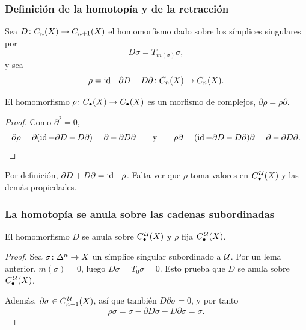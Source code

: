 \begin{frame}[allowframebreaks]
  \frametitle{Definición de la homotopía y de la retracción}

  \begin{definition}
    Sea $D\colon C_n(X)\to C_{n+1}(X)$ el homomorfismo dado sobre los
    símplices singulares por
    \[
      D\sigma=T_{m(\sigma)}\sigma,
    \]
    y sea \[\rho=\operatorname{id}-\partial D-D\partial\colon C_n(X)\to C_n(X).\]
  \end{definition}

  \framebreak

  \begin{lemma}
    El homomorfismo $\rho\colon C_\bullet(X)\to C_\bullet(X)$ es un morfismo de complejos, $\partial\rho=\rho\partial$.
  \end{lemma}

  \begin{proof}
    Como $\partial^2=0$,
    \[
      \partial\rho
      = \partial(\operatorname{id}-\partial D-D\partial)
      =\partial-\partial D\partial
      \qquad\text{y}\qquad
      \rho\partial
      =(\operatorname{id}-\partial D-D\partial)\partial
      =\partial-\partial D\partial.
    \]
  \end{proof}

  Por definición, $\partial D+D\partial=\operatorname{id}-\rho$. Falta ver que $\rho$
  toma valores en $C^{\mkern2mu\mathcal{U}}_\bullet(X)$ y las demás propiedades.
\end{frame}

\begin{frame}
  \frametitle{La homotopía se anula sobre las cadenas subordinadas}

  \begin{lemma}
    El homomorfismo $D$ se anula sobre $C^{\mkern2mu\mathcal{U}}_\bullet(X)$ y $\rho$ fija
    $C^{\mkern2mu\mathcal{U}}_\bullet(X)$.
  \end{lemma}

  \begin{proof}
    Sea $\sigma\colon\Delta^{n}\to X$ un símplice singular subordinado a $\mathcal{U}$. Por un lema anterior,
    $m(\sigma)=0$, luego $D\sigma=T_0\sigma=0$. Esto prueba que $D$ se anula
    sobre $C^{\mkern2mu\mathcal{U}}_\bullet(X)$.

    \medskip

    Además, $\partial\sigma\in C^{\mkern2mu\mathcal{U}}_{n-1}(X)$, así que también
    $D\partial\sigma=0$, y por tanto
    \[
      \rho\sigma=\sigma-\partial D\sigma-D\partial\sigma=\sigma.
    \]
  \end{proof}
\end{frame}

